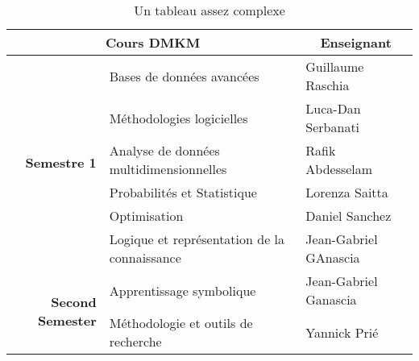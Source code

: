 \documentclass{article}
\begin{document}
\begin{table}

\caption{Un tableau assez complexe}
\label{exercice_3.2}


\begin{tabular}{|r|l|l|}

\hline
\multicolumn{2}{|c|}{\bf Cours DMKM} &  \multicolumn{1}{|c|}{\bf Enseignant}
\\
\hline

\multirow{6}{*}{ \bf Semestre 1} &Bases de données avancées  & Guillaume Raschia
\\
\cline{2-3}
&Méthodologies logicielles & Luca-Dan Serbanati
\\
\cline{2-3}
&Analyse de données multidimensionnelles & Rafik Abdesselam
\\
\cline{2-3}
&Probabilités et Statistique & Lorenza Saitta
\\
\cline{2-3}
&Optimisation & Daniel Sanchez
\\
\cline{2-3}
&Logique et représentation de la connaissance & Jean-Gabriel GAnascia
\\
\hline



\multirow{2}{*}{ \bf Second Semester} & Apprentissage symbolique  & Jean-Gabriel Ganascia
\\
\cline{2-3}
&Méthodologie et outils de recherche & Yannick Prié
\\
\hline


\end{tabular}

\end{table}
\end{document}
